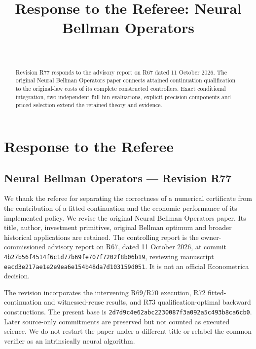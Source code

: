 \documentclass[ecta,nameyear,draft]{econsocart}
\begin{document}
\begin{frontmatter}
\title{Response to the Referee: Neural Bellman Operators}
\begin{aug}
\author[id=au1,addressref={add1}]{~}
\address[id=add1]{Peking University}
\end{aug}
\begin{abstract}Revision R77 responds to the advisory report on R67 dated 11 October 2026. The original Neural Bellman Operators paper connects attained continuation qualification to the original-law costs of its complete constructed controllers. Exact conditional integration, two independent full-bin evaluations, explicit precision components and priced selection extend the retained theory and evidence.\end{abstract}
\end{frontmatter}
\providecommand{\tightlist}{\setlength{\itemsep}{0pt}\setlength{\parskip}{0pt}}
\hypertarget{response-to-the-referee}{%
\section{Response to the Referee}\label{response-to-the-referee}}

\hypertarget{neural-bellman-operators-revision-r77}{%
\subsection{Neural Bellman Operators --- Revision
R77}\label{neural-bellman-operators-revision-r77}}

We thank the referee for separating the correctness of a numerical
certificate from the contribution of a fitted continuation and the
economic performance of its implemented policy. We revise the original
Neural Bellman Operators paper. Its title, author, investment
primitives, original Bellman optimum and broader historical applications
are retained. The controlling report is the owner-commissioned advisory
report on R67, dated 11 October 2026, at commit
\nolinkurl{4b27b56f4514f6c1d77b69fe707f7202f8b06b19}, reviewing manuscript
\nolinkurl{eacd3e217ae1e2e9ea6e154b48da7d103159d051}. It is not an official
Econometrica decision.

The revision incorporates the intervening R69/R70 execution, R72
fitted-continuation and witnessed-reuse results, and R73
qualification-optimal backward constructions. The present base is
\nolinkurl{2d7d9c4e62abc2230087f3a092a5c493b8ca6cb0}. Later source-only
commitments are preserved but not counted as executed science. We do not
restart the paper under a different title or relabel the common verifier
as an intrinsically neural algorithm.
\end{document}
